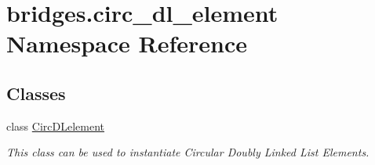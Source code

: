 \hypertarget{namespacebridges_1_1circ__dl__element}{}\section{bridges.\+circ\+\_\+dl\+\_\+element Namespace Reference}
\label{namespacebridges_1_1circ__dl__element}
\subsection*{Classes}
\begin{DoxyCompactItemize}
\item 
class \hyperlink{classbridges_1_1circ__dl__element_1_1_circ_d_lelement}{Circ\+D\+Lelement}
\begin{DoxyCompactList}\small\item\em This class can be used to instantiate Circular Doubly Linked List Elements. \end{DoxyCompactList}\end{DoxyCompactItemize}
